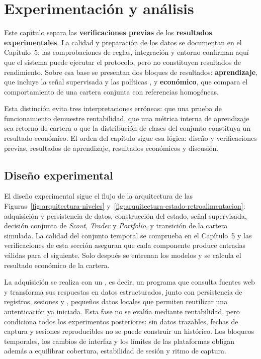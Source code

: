 \chapter{Experimentación y análisis}

\noindent Este capítulo separa las \textbf{verificaciones previas} de los \textbf{resultados experimentales}. La calidad y preparación de los datos se documentan en el Capítulo~5; las comprobaciones de reglas, integración y entorno confirman aquí que el sistema puede ejecutar el protocolo, pero no constituyen resultados de rendimiento. Sobre esa base se presentan dos bloques de resultados: \textbf{aprendizaje}, que incluye la señal supervisada y las políticas , y \textbf{económico}, que compara el comportamiento de una cartera conjunta con referencias homogéneas.

Esta distinción evita tres interpretaciones erróneas: que una prueba de funcionamiento demuestre rentabilidad, que una métrica interna de aprendizaje sea retorno de cartera o que la distribución de clases del conjunto constituya un resultado económico. El orden del capítulo sigue esa lógica: diseño y verificaciones previas, resultados de aprendizaje, resultados económicos y discusión.

\section{Diseño experimental}

El diseño experimental sigue el flujo de la arquitectura de las Figuras~\ref{fig:arquitectura-niveles} y~\ref{fig:arquitectura-estado-retroalimentacion}: adquisición y persistencia de datos, construcción del estado, señal supervisada, decisión conjunta de \textit{Scout}, \textit{Trader} y \textit{Portfolio}, y transición de la cartera simulada. La calidad del conjunto temporal se comprueba en el Capítulo~5 y las verificaciones de esta sección aseguran que cada componente produce entradas válidas para el siguiente. Solo después se entrenan los modelos y se calcula el resultado económico de la cartera.

La adquisición se realiza con un \emph{}, es decir, un programa que consulta fuentes web y transforma sus respuestas en datos estructurados, junto con persistencia de registros, sesiones y \emph{}, pequeños datos locales que permiten reutilizar una autenticación ya iniciada. Esta fase no se evalúa mediante rentabilidad, pero condiciona todos los experimentos posteriores: sin datos trazables, fechas de captura y sesiones reproducibles no se puede construir un histórico. Los bloqueos temporales, los cambios de interfaz y los límites de las plataformas obligan además a equilibrar cobertura, estabilidad de sesión y ritmo de captura.

